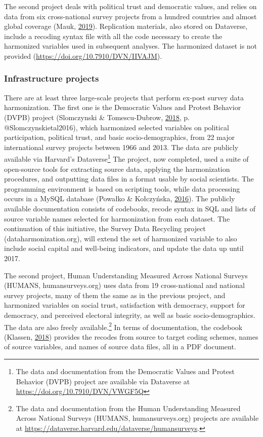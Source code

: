 \documentclass[12pt,]{article}
\let\rmarkdownfootnote\footnote%
\def\footnote{\protect\rmarkdownfootnote}
\begin{document}
The second project deals with political trust and democratic values, and relies on data from six cross-national survey projects from a hundred countries and almost global coverage (Mauk, \protect\hyperlink{ref-Mauk2019}{2019}). Replication materials, also stored on Dataverse, include a recoding syntax file with all the code necessary to create the harmonized variables used in subsequent analyses. The harmonized dataset is not provided (\url{https://doi.org/10.7910/DVN/IIVAJM}).

\hypertarget{infrastructure-projects}{%
\subsubsection{Infrastructure projects}\label{infrastructure-projects}}

There are at least three large-scale projects that perform ex-post survey data harmonization. The first one is the Democratic Values and Protest Behavior (DVPB) project (Slomczynski \& Tomescu-Dubrow, \protect\hyperlink{ref-Slomczynski2018}{2018}, p. @Slomczynskietal2016), which harmonized selected variables on political participation, political trust, and basic socio-demographics, from 22 major international survey projects between 1966 and 2013. The data are publicly available via Harvard's Dataverse\footnote{The data and documentation from the Democratic Values and Protest Behavior (DVPB) project are available via Dataverse at \url{https://doi.org/10.7910/DVN/VWGF5Q}}
The project, now completed, used a suite of open-source tools for extracting source data, applying the harmonization procedures, and outputting data files in a format usable by social scientists. The programming environment is based on scripting tools, while data processing occurs in a MySQL database (Powałko \& Kołczyńska, \protect\hyperlink{ref-Powako2016}{2016}). The publicly available documentation consists of codebooks, recode syntax in SQL and lists of source variable names selected for harmonization from each dataset.
The continuation of this initiative, the Survey Data Recycling project (dataharmonization.org), will extend the set of harmonized variable to also include social capital and well-being indicators, and update the data up until 2017.

The second project, Human Understanding Measured Across National Surveys (HUMANS, humansurveys.org) uses data from 19 cross-national and national survey projects, many of them the same as in the previous project, and harmonized variables on social trust, satisfaction with democracy, support for democracy, and perceived electoral integrity, as well as basic socio-demographics. The data are also freely available.\footnote{The data and documentation from the Human Understanding Measured Across National Surveys (HUMANS, humansurveys.org) projects are available at \url{https://dataverse.harvard.edu/dataverse/humansurveys}.}
In terms of documentation, the codebook (Klassen, \protect\hyperlink{ref-Klassen2018}{2018}) provides the recodes from source to target coding schemes, names of source variables, and names of source data files, all in a PDF document.
\end{document}
